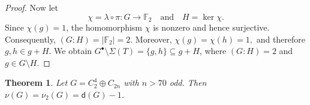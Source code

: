 \documentclass[a4paper, 10pt]{amsart}
\theoremstyle{plain}
\newtheorem{theorem}{\bf Theorem}[section]
\theoremstyle{definition}
\numberwithin{equation}{section}
\begin{document}
{\begin{proof}
	Now let
	\[
	\chi=\lambda\circ\pi\colon G\longrightarrow\mathbb F_2
	\quad\text{and}\quad
	H=\ker\chi.
	\]
	Since $\chi(g)=1$, the homomorphism $\chi$ is nonzero and hence
	surjective. Consequently, $
	(G:H)=|\mathbb F_2|=2.$
	Moreover, $
	\chi(g)=\chi(h)=1,$
	and therefore $
	g,h\in g+H.$
	We obtain $
	G^{\bullet}\setminus\Sigma(T)
	=\{g,h\}\subseteq g+H$,
	where $(G:H)=2$ and $g\in G\setminus H$.
%
%
%	
%	
%	
%	
\end{proof}


\begin{theorem}\label{5.5}
Let $G=C_2^4\oplus C_{2n}$ with $n>70$  odd. Then $\nu(G)=\nu_2 (G)=\mathsf d (G)-1$.
\end{theorem}

}
\end{document}

